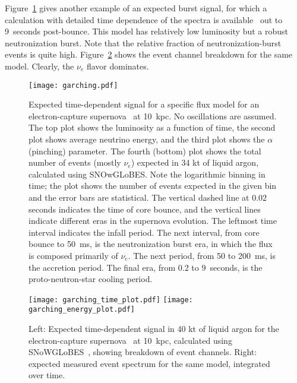 Figure~\ref{fig:garching} gives another example of an expected burst
signal, for which a calculation with detailed time dependence of the
spectra is available~\cite{Huedepohl:2009wh} out to 9~seconds
post-bounce.  This model has relatively low luminosity but a robust
neutronization burst.  Note that the relative fraction of
neutronization-burst events is quite high.
Figure~\ref{fig:eventrates} shows the event channel breakdown for the same model.  Clearly, the $\nu_e$
flavor dominates.

%
\begin{figure}[!htb]
\centering
\texttt{[image: garching.pdf]}
\caption[Garching flux signal with neutronization burst]{ Expected
  time-dependent signal for a specific flux model for an
  electron-capture supernova~\cite{Huedepohl:2009wh} at 10~kpc.  No oscillations are assumed. The
  top plot shows the luminosity as a function of time, the second plot
  shows average neutrino energy, and the third plot shows the $\alpha$
  (pinching) parameter.  The fourth (bottom) plot shows the total number of
  events (mostly $\nu_e$) expected in 34 kt of liquid argon, calculated using
  SNOwGLoBES.  Note the logarithmic binning in time; the plot shows
  the number of events expected in the given bin and the error bars
  are statistical. The vertical dashed line at 0.02 seconds indicates
  the time of core bounce, and the vertical lines indicate different
  eras in the supernova evolution.  The leftmost time interval
  indicates the infall period.  The next interval, from core bounce to
  50~ms, is the neutronization burst era, in which the flux is
  composed primarily of $\nu_e$.  The next period, from 50 to 200~ms,
  is the accretion period. The final era, from 0.2 to 9~seconds, is
  the proto-neutron-star cooling period.  }
\label{fig:garching}
\end{figure}


\begin{figure}[!htb]
\centering
\texttt{[image: garching\_time\_plot.pdf]}
\texttt{[image: garching\_energy\_plot.pdf]}
\vspace{-5pt}
\caption[SN $\nu$ event rates in \SI{40}{kt} of LAr for Garching flux]{Left: Expected
  time-dependent signal in 40 kt of liquid argon for the electron-capture supernova~\cite{Huedepohl:2009wh} at 10~kpc, calculated using SNoWGLoBES~\cite{snowglobes}, showing breakdown of event channels.  Right: expected measured event spectrum for the same model, integrated over time.}

  \label{fig:eventrates}
\end{figure}

